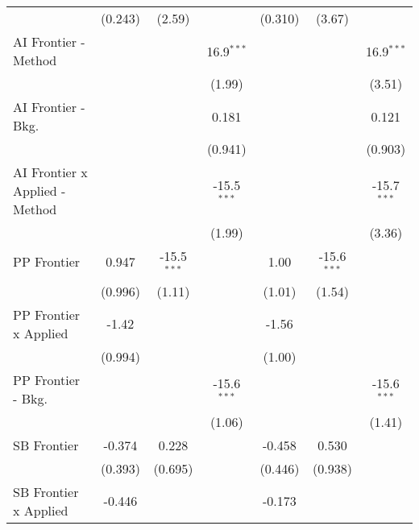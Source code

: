 \begin{tabular}{lcccccc}
                                  & (0.243)       & (2.59)        &               & (0.310)       & (3.67)        &   \\   
   AI Frontier - Method           &               &               & 16.9$^{***}$  &               &               & 16.9$^{***}$\\   
                                  &               &               & (1.99)        &               &               & (3.51)\\   
   AI Frontier - Bkg.             &               &               & 0.181         &               &               & 0.121\\   
                                  &               &               & (0.941)       &               &               & (0.903)\\   
   AI Frontier x Applied - Method &               &               & -15.5$^{***}$ &               &               & -15.7$^{***}$\\   
                                  &               &               & (1.99)        &               &               & (3.36)\\   
   PP Frontier                    & 0.947         & -15.5$^{***}$ &               & 1.00          & -15.6$^{***}$ &   \\   
                                  & (0.996)       & (1.11)        &               & (1.01)        & (1.54)        &   \\   
   PP Frontier x Applied          & -1.42         &               &               & -1.56         &               &   \\   
                                  & (0.994)       &               &               & (1.00)        &               &   \\   
   PP Frontier - Bkg.             &               &               & -15.6$^{***}$ &               &               & -15.6$^{***}$\\   
                                  &               &               & (1.06)        &               &               & (1.41)\\   
   SB Frontier                    & -0.374        & 0.228         &               & -0.458        & 0.530         &   \\   
                                  & (0.393)       & (0.695)       &               & (0.446)       & (0.938)       &   \\   
   SB Frontier x Applied          & -0.446        &               &               & -0.173        &               &   \\   

\end{tabular}
